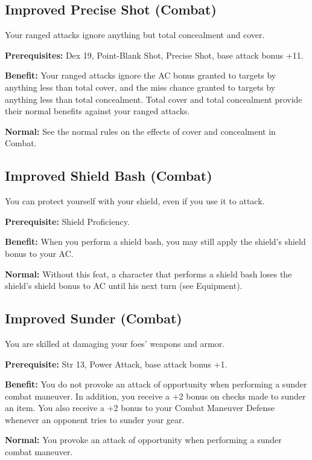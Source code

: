 \subsection{Improved Precise Shot (Combat)}

				
Your ranged attacks ignore anything but total concealment and cover.
				
\textbf{Prerequisites:} Dex 19, Point-Blank Shot, Precise Shot, base attack bonus +11.
				
\textbf{Benefit:} Your ranged attacks ignore the AC bonus granted to targets by anything less than total cover, and the miss chance granted to targets by anything less than total concealment. Total cover and total concealment provide their normal benefits against your ranged attacks.
				
\textbf{Normal:} See the normal rules on the effects of cover and concealment in Combat. 
				
\subsection{Improved Shield Bash (Combat)}

				
You can protect yourself with your shield, even if you use it to attack.
				
\textbf{Prerequisite:} Shield Proficiency.
				
\textbf{Benefit:} When you perform a shield bash, you may still apply the shield's shield bonus to your AC.
				
\textbf{Normal:} Without this feat, a character that performs a shield bash loses the shield's shield bonus to AC until his next turn (see Equipment).
				
\subsection{Improved Sunder (Combat)}

				
You are skilled at damaging your foes' weapons and armor.
				
\textbf{Prerequisite:} Str 13, Power Attack, base attack bonus +1.
				
\textbf{Benefit:} You do not provoke an attack of opportunity when performing a sunder combat maneuver. In addition, you receive a +2 bonus on checks made to sunder an item. You also receive a +2 bonus to your Combat Maneuver Defense whenever an opponent tries to sunder your gear. 
				
\textbf{Normal:} You provoke an attack of opportunity when performing a sunder combat maneuver.
				
